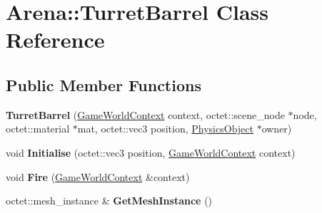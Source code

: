 \hypertarget{class_arena_1_1_turret_barrel}{\section{Arena\+:\+:Turret\+Barrel Class Reference}
\label{class_arena_1_1_turret_barrel}
}
\subsection*{Public Member Functions}
\begin{DoxyCompactItemize}
\item 
\hypertarget{class_arena_1_1_turret_barrel_a727db8f92484eee094e0c7f49ab7d835}{{\bfseries Turret\+Barrel} (\hyperlink{struct_arena_1_1_game_world_context}{Game\+World\+Context} context, octet\+::scene\+\_\+node $\ast$node, octet\+::material $\ast$mat, octet\+::vec3 position, \hyperlink{class_arena_1_1_physics_object}{Physics\+Object} $\ast$owner)}\label{class_arena_1_1_turret_barrel_a727db8f92484eee094e0c7f49ab7d835}

\item 
\hypertarget{class_arena_1_1_turret_barrel_a2857b8da39aa446c4b9dec5cc870c96b}{void {\bfseries Initialise} (octet\+::vec3 position, \hyperlink{struct_arena_1_1_game_world_context}{Game\+World\+Context} context)}\label{class_arena_1_1_turret_barrel_a2857b8da39aa446c4b9dec5cc870c96b}

\item 
\hypertarget{class_arena_1_1_turret_barrel_a12d50f6e909f6aa141427aa28cf12005}{void {\bfseries Fire} (\hyperlink{struct_arena_1_1_game_world_context}{Game\+World\+Context} \&context)}\label{class_arena_1_1_turret_barrel_a12d50f6e909f6aa141427aa28cf12005}

\item 
\hypertarget{class_arena_1_1_turret_barrel_a80a6679ecf54837da806a261b048899b}{octet\+::mesh\+\_\+instance \& {\bfseries Get\+Mesh\+Instance} ()}\label{class_arena_1_1_turret_barrel_a80a6679ecf54837da806a261b048899b}

\end{DoxyCompactItemize}
